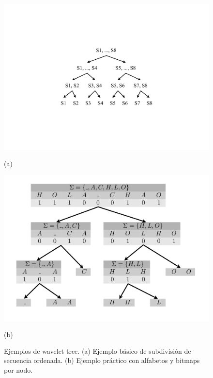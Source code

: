 \begin{figure}%
    	\centering
    	\begin{minipage}{0.4\textwidth}
    		\centering
    		\includegraphics[scale=.45, clip,  trim=230 182 230 180]{img/arte/graphs-wavelet-tree.pdf}
    		
    		(a)
    	\end{minipage}
    	\begin{minipage}{0.5\textwidth}
    		\centering
    		\includegraphics[scale=.3, clip, trim=0 0 0 0]{img/arte/graphs-wavelet-tree2.pdf}

    		(b)
    	\end{minipage}

    \caption{Ejemplos de wavelet-tree. (a) Ejemplo básico de subdivisión de secuencia ordenada. (b) Ejemplo práctico con alfabetos y bitmaps por nodo.}
    \label{fig:wavelet-tree}
\end{figure}

